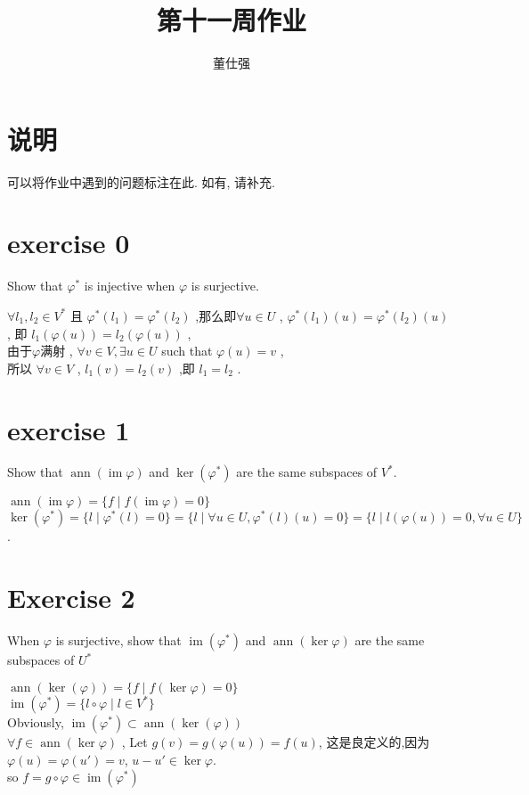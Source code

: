 \documentclass[11pt]{ctexart}
\title{第十一周作业}
\author{董仕强}
\theoremstyle{definition}
\numberwithin{equation}{section}
\newcommand{\op}[1]{\operatorname{#1}}%
\theoremstyle{definition}
\theoremstyle{remark}
\begin{document}
\maketitle

\section{说明}

可以将作业中遇到的问题标注在此. 如有, 请补充.

\tableofcontents

\newpage


\section{exercise 0}
Show that $\varphi ^\ast$ is injective when $\varphi$ is surjective.
\begin{aaa}
    $\forall l_1,l_2 \in V^*$ 且 $\varphi^*(l_1)=\varphi^*(l_2)$ ,那么即$\forall u\in U$ , $\varphi^*(l_1)(u)=\varphi^*(l_2)(u)$ , 即 $l_1(\varphi(u))=l_2(\varphi(u))$ ,\\
    由于$\varphi$满射 , $\forall v \in V, \exists u \in U$ such that $\varphi(u)=v$ ,\\
    所以 $\forall v \in V$ , $l_1(v)=l_2(v)$ ,即 $l_1=l_2$ .
\end{aaa}   

\section{exercise 1}
Show that $\operatorname{ann}(\operatorname{im} \varphi)$ and $\ker (\varphi^\ast)$ are the same subspaces of $V^\ast$.
\begin{aaa}
    $\op{ann}(\op{im}\varphi)=\{f\mid f(\op{im}\varphi)=0\}$\\
    $\ker (\varphi^*)=\{l\mid \varphi^*(l)=0\}=\{l\mid \forall u \in U, \varphi^*(l)(u)=0\}=\{l\mid l(\varphi(u))=0, \forall u\in U\}$.
\end{aaa}
\section{Exercise 2}
When $\varphi$ is surjective, show that $\operatorname{im} (\varphi^\ast)$ and $\operatorname{ann}(\ker \varphi)$ are the same subspaces of $U^\ast$
\begin{aaa}
    $\op{ann}(\ker(\varphi))=\{f\mid f(\ker \varphi)=0\}$\\
    $\op{im}(\varphi^*)=\{l\circ \varphi\mid l\in V^*\}$\\
    Obviously, $\op{im}(\varphi^*)\subset \op{ann}(\ker(\varphi))$\\
    $\forall f\in \op{ann}(\ker\varphi)$ , Let $g(v)=g(\varphi(u))=f(u)$, 这是良定义的,因为$\varphi(u)=\varphi(u')=v$, $u-u'\in \ker \varphi$.\\
    so $f=g\circ \varphi\in \op{im}(\varphi^*)$
\end{aaa}
\end{document}
